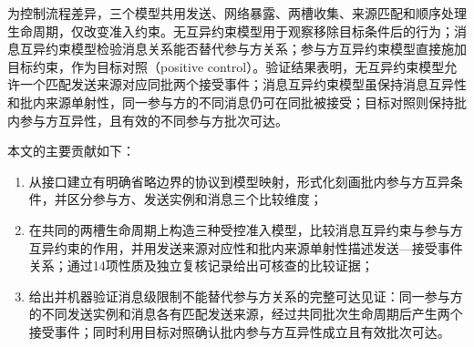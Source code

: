 为控制流程差异，三个模型共用发送、网络暴露、两槽收集、来源匹配和顺序处理生命周期，仅改变准入约束。无互异约束模型用于观察移除目标条件后的行为；消息互异约束模型检验消息关系能否替代参与方关系；参与方互异约束模型直接施加目标约束，作为目标对照（positive control）。验证结果表明，无互异约束模型允许一个匹配发送来源对应同批两个接受事件；消息互异约束模型虽保持消息互异性和批内来源单射性，同一参与方的不同消息仍可在同批被接受；目标对照则保持批内参与方互异性，且有效的不同参与方批次可达。

本文的主要贡献如下：
\begin{enumerate}[label=\arabic*)]
  \item 从\batchreceive 接口建立有明确省略边界的协议到模型映射，形式化刻画批内参与方互异条件，并区分参与方、发送实例和消息三个比较维度；
  \item 在共同的两槽生命周期上构造三种受控准入模型，比较消息互异约束与参与方互异约束的作用，并用发送来源对应性和批内来源单射性描述发送—接受事件关系；通过14项性质及独立复核记录给出可核查的比较证据；
  \item 给出并机器验证消息级限制不能替代参与方关系的完整可达见证：同一参与方的不同发送实例和消息各有匹配发送来源，经过共同批次生命周期后产生两个接受事件；同时利用目标对照确认批内参与方互异性成立且有效批次可达。
\end{enumerate}

